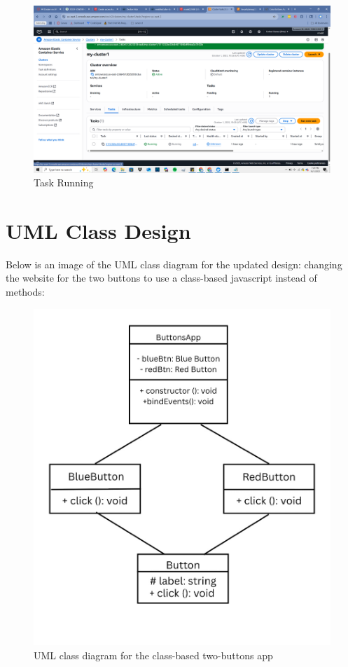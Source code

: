 \begin{figure}
    \centering
    \includegraphics[width=0.6\linewidth]{Book_SSW590 (1)/eps/Screenshots/TaskRunning.png}
    \caption{Task Running}
    \label{fig:Tasking Running}
\end{figure}

\section{UML Class Design}
Below is an image of the UML class diagram for the updated design: changing the website for the two buttons to use a class-based javascript instead of methods: 

\begin{figure}[htbp]
\centering
\includegraphics[width=0.85\linewidth]{uml_diagram.jpg}
\caption{UML class diagram for the class-based two-buttons app}
\label{fig:uml-diagram}
\end{figure}